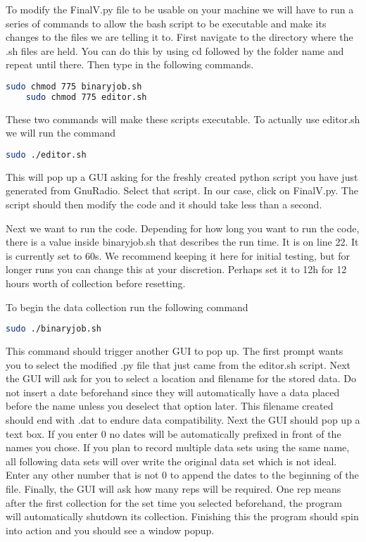 \documentclass[letterpaper,12pt,notitlepage]{report} %
\begin{document}
To modify the FinalV.py file to be usable on your machine we will have to run a series of commands to allow the bash script to be executable and make its changes to the files we are telling it to. First navigate to the directory where the .sh files are held. You can do this by using cd followed by the folder name and repeat until there. Then type in the following commands.

\begin{lstlisting}[language=bash]
	sudo chmod 775 binaryjob.sh
	sudo chmod 775 editor.sh
\end{lstlisting}

These two commands will make these scripts executable. To actually use editor.sh we will run the command

\begin{lstlisting}[language=bash]
	sudo ./editor.sh
\end{lstlisting}

This will pop up a GUI asking for the freshly created python script you have just generated from GnuRadio. Select that script. In our case, click on FinalV.py. The script should then modify the code and it should take less than a second. 

Next we want to run the code. Depending for how long you want to run the code, there is a value inside binaryjob.sh that describes the run time. It is on line 22. It is currently set to 60s. We recommend keeping it here for initial testing, but for longer runs you can change this at your discretion. Perhaps set it to 12h for 12 hours worth of collection before resetting.

To begin the data collection run the following command

\begin{lstlisting}[language=bash]
	sudo ./binaryjob.sh
\end{lstlisting}

This command should trigger another GUI to pop up. The first prompt wants you to select the modified .py file that just came from the editor.sh script. Next the GUI will ask for you to select a location and filename for the stored data. Do not insert a date beforehand since they will automatically have a data placed before the name unless you deselect that option later. This filename created should end with .dat to endure data compatibility. Next the GUI should pop up a text box. If you enter 0 no dates will be automatically prefixed in front of the names you chose. If you plan to record multiple data sets using the same name, all following data sets will over write the original data set which is not ideal. Enter any other number that is not 0 to append the dates to the beginning of the file. Finally, the GUI will ask how many reps will be required. One rep means after the first collection for the set time you selected beforehand, the program will automatically shutdown its collection. Finishing this the program should spin into action and you should see a window popup.
\end{document}
